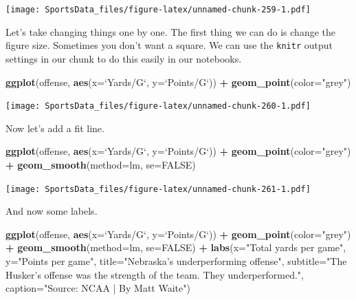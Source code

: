 \documentclass[]{book}
\newenvironment{Shaded}{\begin{snugshade}}{\end{snugshade}}
\newcommand{\DataTypeTok}[1]{\textcolor[rgb]{0.13,0.29,0.53}{#1}}
\newcommand{\KeywordTok}[1]{\textcolor[rgb]{0.13,0.29,0.53}{\textbf{#1}}}
\newcommand{\NormalTok}[1]{#1}
\newcommand{\OperatorTok}[1]{\textcolor[rgb]{0.81,0.36,0.00}{\textbf{#1}}}
\newcommand{\OtherTok}[1]{\textcolor[rgb]{0.56,0.35,0.01}{#1}}
\newcommand{\StringTok}[1]{\textcolor[rgb]{0.31,0.60,0.02}{#1}}
\begin{document}
\texttt{[image: SportsData\_files/figure-latex/unnamed-chunk-259-1.pdf]}

Let's take changing things one by one. The first thing we can do is change the figure size. Sometimes you don't want a square. We can use the \texttt{knitr} output settings in our chunk to do this easily in our notebooks.

\begin{Shaded}
\begin{Highlighting}[]
\KeywordTok{ggplot}\NormalTok{(offense, }\KeywordTok{aes}\NormalTok{(}\DataTypeTok{x=}\StringTok{`}\DataTypeTok{Yards/G}\StringTok{`}\NormalTok{, }\DataTypeTok{y=}\StringTok{`}\DataTypeTok{Points/G}\StringTok{`}\NormalTok{)) }\OperatorTok{+}\StringTok{ }
\StringTok{  }\KeywordTok{geom_point}\NormalTok{(}\DataTypeTok{color=}\StringTok{"grey"}\NormalTok{)}
\end{Highlighting}
\end{Shaded}

\texttt{[image: SportsData\_files/figure-latex/unnamed-chunk-260-1.pdf]}

Now let's add a fit line.

\begin{Shaded}
\begin{Highlighting}[]
\KeywordTok{ggplot}\NormalTok{(offense, }\KeywordTok{aes}\NormalTok{(}\DataTypeTok{x=}\StringTok{`}\DataTypeTok{Yards/G}\StringTok{`}\NormalTok{, }\DataTypeTok{y=}\StringTok{`}\DataTypeTok{Points/G}\StringTok{`}\NormalTok{)) }\OperatorTok{+}\StringTok{ }
\StringTok{  }\KeywordTok{geom_point}\NormalTok{(}\DataTypeTok{color=}\StringTok{"grey"}\NormalTok{) }\OperatorTok{+}\StringTok{ }\KeywordTok{geom_smooth}\NormalTok{(}\DataTypeTok{method=}\NormalTok{lm, }\DataTypeTok{se=}\OtherTok{FALSE}\NormalTok{)}
\end{Highlighting}
\end{Shaded}

\texttt{[image: SportsData\_files/figure-latex/unnamed-chunk-261-1.pdf]}

And now some labels.

\begin{Shaded}
\begin{Highlighting}[]
\KeywordTok{ggplot}\NormalTok{(offense, }\KeywordTok{aes}\NormalTok{(}\DataTypeTok{x=}\StringTok{`}\DataTypeTok{Yards/G}\StringTok{`}\NormalTok{, }\DataTypeTok{y=}\StringTok{`}\DataTypeTok{Points/G}\StringTok{`}\NormalTok{)) }\OperatorTok{+}\StringTok{ }
\StringTok{  }\KeywordTok{geom_point}\NormalTok{(}\DataTypeTok{color=}\StringTok{"grey"}\NormalTok{) }\OperatorTok{+}\StringTok{ }\KeywordTok{geom_smooth}\NormalTok{(}\DataTypeTok{method=}\NormalTok{lm, }\DataTypeTok{se=}\OtherTok{FALSE}\NormalTok{) }\OperatorTok{+}\StringTok{ }
\StringTok{  }\KeywordTok{labs}\NormalTok{(}\DataTypeTok{x=}\StringTok{"Total yards per game"}\NormalTok{, }\DataTypeTok{y=}\StringTok{"Points per game"}\NormalTok{, }\DataTypeTok{title=}\StringTok{"Nebraska's underperforming offense"}\NormalTok{, }\DataTypeTok{subtitle=}\StringTok{"The Husker's offense was the strength of the team. They underperformed."}\NormalTok{, }\DataTypeTok{caption=}\StringTok{"Source: NCAA | By Matt Waite"}\NormalTok{)}
\end{Highlighting}
\end{Shaded}
\end{document}
